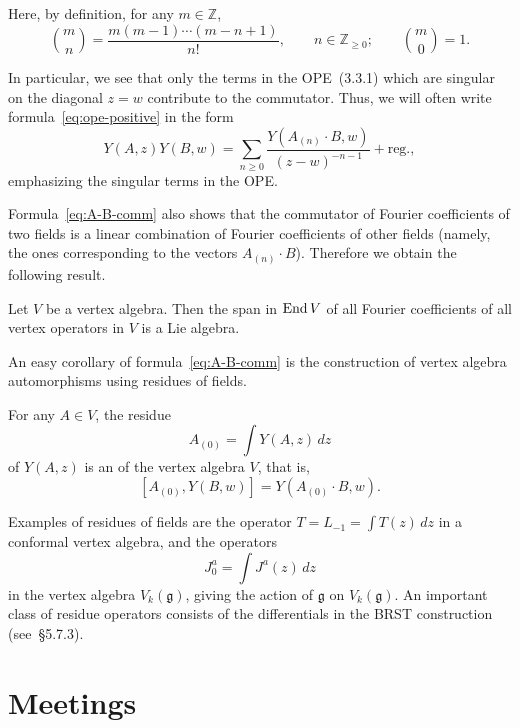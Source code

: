 \documentclass[12pt]{article}
\begin{document}
Here, by definition, for any $m\in\mathbb{Z}$,
\[
\binom{m}{n}
= \frac{m(m-1)\cdots(m-n+1)}{n!}, \qquad n\in\mathbb{Z}_{\ge0}; \qquad \binom{m}{0}=1.
\]

In particular, we see that only the terms in the OPE~(3.3.1) which are singular on the diagonal $z=w$ contribute to the commutator.  
Thus, we will often write formula~\eqref{eq:ope-positive} in the form
\[
Y(A,z)Y(B,w)
= \sum_{n\ge0}\frac{Y(A_{(n)}\cdot B,w)}{(z-w)^{-n-1}} + \text{reg.},
\]
emphasizing the singular terms in the OPE.

Formula~\eqref{eq:A-B-comm} also shows that the commutator of Fourier coefficients of two fields is a linear combination of Fourier coefficients of other fields (namely, the ones corresponding to the vectors $A_{(n)}\cdot B$).  
Therefore we obtain the following result.

\begin{proposition}[3.3.7]
Let $V$ be a vertex algebra.  
Then the span in $\operatorname{End} V$ of all Fourier coefficients of all vertex operators in $V$ is a Lie algebra.
\end{proposition}

An easy corollary of formula~\eqref{eq:A-B-comm} is the construction of vertex algebra automorphisms using residues of fields.

\begin{corollary}[3.3.8]
For any $A\in V$, the residue
\[
A_{(0)} = \int Y(A,z)\,dz
\]
of $Y(A,z)$ is an  of the vertex algebra $V$, that is,
\[
[A_{(0)},Y(B,w)] = Y(A_{(0)}\cdot B,w).
\]
\end{corollary}

\noindent
Examples of residues of fields are the operator $T = L_{-1} = \int T(z)\,dz$ in a conformal vertex algebra, and the operators
\[
J^a_0 = \int J^a(z)\,dz
\]
in the vertex algebra $V_k(\mathfrak{g})$, giving the action of $\mathfrak{g}$ on $V_k(\mathfrak{g})$.
An important class of residue operators consists of the differentials in the BRST construction (see~\S5.7.3).

 \section*{Meetings}
\end{document}
